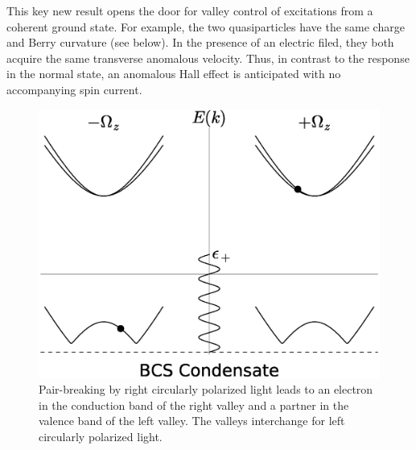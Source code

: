 This key new result opens the door for valley control of excitations
from a coherent ground state.
For example, the two quasiparticles have the same charge and Berry curvature
(see below).
In the presence of an electric filed,
they both acquire the same transverse anomalous velocity.
Thus, in contrast to the response in the normal state,
an anomalous Hall effect is anticipated
with no accompanying spin current.

\begin{figure}
  \includegraphics[width=\columnwidth]{figures/bcs-excitation}
  \caption{%
    Pair-breaking by right circularly polarized light
    leads to an electron in the conduction band of the right valley
    and a partner in the valence band of the left valley.
    The valleys interchange for left circularly polarized light.
  }\label{fig:optical-excitation}
\end{figure}
